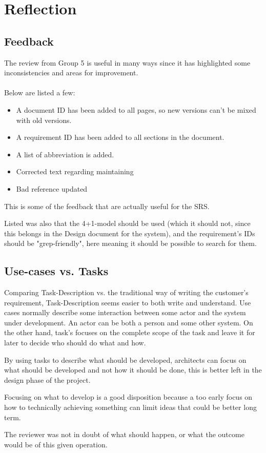 \documentclass[Main]{subfiles}
\begin{document}
\chapter{Reflection}

\section{Feedback}

The review from Group 5 is useful in many ways since it has highlighted some inconsistencies and areas for improvement.
\\
\\
Below are listed a few:

\begin{itemize}

\item A document ID has been added to all pages, so new versions can't be mixed with old versions.

\item A requirement ID has been added to all sections in the document.

\item A list of abbreviation is added.

\item Corrected text regarding maintaining

\item Bad reference updated 

\end{itemize}
This is some of the feedback that are actually useful for the SRS.

Listed was also that the 4+1-model should be used (which it should not, since this belongs in the Design document for the system), and the requirement's IDs should be "grep-friendly", here meaning it should be possible to search for them.

\section{Use-cases vs. Tasks}

Comparing Task-Description vs. the traditional way of writing the customer's requirement, Task-Description seems easier to both write and understand.
Use cases normally describe some interaction between some actor and the system under development.
An actor can be both a person and some other system.
On the other hand, task's focuses on the complete scope of the task and leave it for later to decide who should do what and how.

By using tasks to describe what should be developed, architects can focus on what should be developed and not how it should be done, this is better left in the design phase of the project.

Focusing on what to develop is a good disposition because a too early focus on how to technically achieving something can limit ideas that could be better long term.

The reviewer was not in doubt of what should happen, or what the outcome would be of this given operation.
\end{document}
